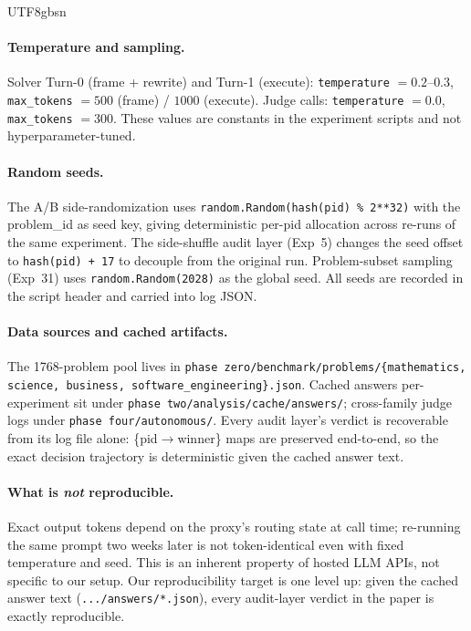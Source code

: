 \documentclass{article}
\begin{document}
\begin{CJK*}{UTF8}{gbsn}
\paragraph{Temperature and sampling.} Solver Turn-0 (frame + rewrite)
and Turn-1 (execute): \texttt{temperature} \(= 0.2\text{--}0.3\),
\texttt{max\_tokens} \(= 500\) (frame) / \(1000\) (execute). Judge
calls: \texttt{temperature} \(= 0.0\), \texttt{max\_tokens} \(= 300\).
These values are constants in the experiment scripts and not
hyperparameter-tuned.

\paragraph{Random seeds.} The A/B side-randomization uses
\texttt{random.Random(hash(pid) \% 2**32)} with the problem\_id as
seed key, giving deterministic per-pid allocation across re-runs of
the same experiment. The side-shuffle audit layer (Exp~5) changes
the seed offset to \texttt{hash(pid) + 17} to decouple from the
original run. Problem-subset sampling (Exp~31) uses
\texttt{random.Random(2028)} as the global seed. All seeds are
recorded in the script header and carried into log JSON.

\paragraph{Data sources and cached artifacts.} The 1768-problem pool
lives in \texttt{phase zero/benchmark/problems/\{mathematics,
science, business, software\_engineering\}.json}. Cached answers
per-experiment sit under \texttt{phase two/analysis/cache/answers/};
cross-family judge logs under \texttt{phase four/autonomous/}.
Every audit layer's verdict is recoverable from its log file alone:
\{pid\(\to\)winner\} maps are preserved end-to-end, so the exact
decision trajectory is deterministic given the cached answer text.

\paragraph{What is \emph{not} reproducible.} Exact output tokens
depend on the proxy's routing state at call time; re-running the
same prompt two weeks later is not token-identical even with fixed
temperature and seed. This is an inherent property of hosted LLM
APIs, not specific to our setup. Our reproducibility target is one
level up: given the cached answer text (\texttt{.../answers/*.json}),
every audit-layer verdict in the paper is exactly reproducible.


\end{CJK*}
\end{document}

